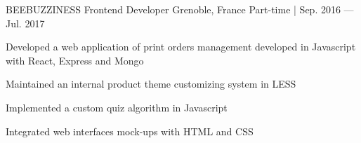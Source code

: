 \begin{cventries}
  \cventry
  	{BEEBUZZINESS} %
    {Frontend Developer} %
    {Grenoble, France} %
    {Part-time | Sep. 2016 — Jul. 2017} %
    {
      \begin{cvitems} %
        \item {Developed a web application of print orders management developed in Javascript with React, Express and Mongo}
        \item {Maintained an internal product theme customizing system in LESS}
        \item {Implemented a custom quiz algorithm in Javascript}
        \item {Integrated web interfaces mock-ups with HTML and CSS}
      \end{cvitems}
    }

\end{cventries}
